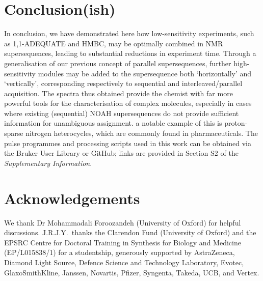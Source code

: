 \documentclass[a4paper,12pt]{article}
\newcommand{\meshort}{J.R.J.Y.}
\newcommand{\nitrogen}{\ch{^{15}N}}
\begin{document}
\begin{refsection}
\section{Conclusion(ish)}

In conclusion, we have demonstrated here how low-sensitivity experiments, such as 1,1-ADEQUATE and \nitrogen{} HMBC, may be optimally combined in NMR supersequences, leading to substantial reductions in experiment time.
Through a generalisation of our previous concept of parallel supersequences, further high-sensitivity  modules may be added to the supersequence both `horizontally' and `vertically', corresponding respectively to sequential and interleaved/parallel acquisition.
The spectra thus obtained provide the chemist with far more powerful tools for the characterisation of complex molecules, especially in cases where existing (sequential) NOAH supersequences do not provide sufficient information for unambiguous assignment.
a notable example of this is proton-sparse nitrogen heterocycles, which are commonly found in pharmaceuticals.
The pulse programmes and processing scripts used in this work can be obtained via the Bruker User Library or GitHub; links are provided in Section S2 of the \textit{Supplementary Information}.


\section*{Acknowledgements}

We thank Dr Mohammadali Foroozandeh (University of Oxford) for helpful discussions.
\meshort{}\ thanks the Clarendon Fund (University of Oxford) and the EPSRC Centre for Doctoral Training in Synthesis for Biology and Medicine (EP/L015838/1) for a studentship, generously supported by AstraZeneca, Diamond Light Source, Defence Science and Technology Laboratory, Evotec, GlaxoSmithKline, Janssen, Novartis, Pfizer, Syngenta, Takeda, UCB, and Vertex.

\AtNextBibliography{\small}
\printbibliography{}
\end{refsection}


\end{document}
